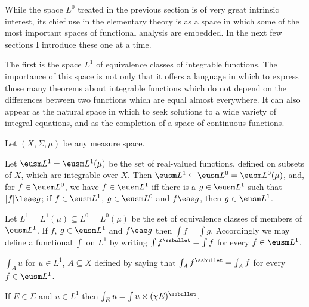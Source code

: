 
\def\chaptername{Function spaces}
\def\sectionname{$L^1$}


While the space $L^0$ treated in the previous section is of very great
intrinsic interest, its chief use in the elementary theory is as a
space
in which some of the most important spaces of functional analysis are
embedded.   In the next few sections I introduce these one at a time.

The first is the space $L^1$ of equivalence classes of integrable
functions.   The importance of this space is not only that it offers a
language in which to express those many theorems about integrable
functions which do not depend on the differences between two functions
which are equal almost everywhere.   It can also appear as the natural
space in which to seek solutions to a wide variety of integral
equations, and as the completion of a space of continuous functions.

  Let $(X,\Sigma,\mu)$ be any
measure space.

 Let $\eusm L^1=\eusm L^1(\mu)$ be the set of
real-valued functions, defined on subsets of $X$, which are integrable
over $X$.   Then
$\eusm L^1\subseteq\eusm L^0=\eusm L^0(\mu)$, and, for $f\in\eusm L^0$, we
have $f\in\eusm L^1$ iff there is a $g\in\eusm L^1$ such that
$|f|\leae g$;   if $f\in\eusm L^1$, $g\in\eusm L^0$ and $f\eae g$,
then
$g\in\eusm L^1$.   


 Let $L^1=L^1(\mu)\subseteq L^0=L^0(\mu)$ be
the
set of equivalence
classes of members of $\eusm L^1$.   If $f$, $g\in \eusm L^1$ and
$f\eae g$ then $\int f=\int g$.   Accordingly we may
define a
functional $\int$ on $L^1$ by writing $\int f^{\ssbullet}=\int f$ for
every $f\in\eusm L^1$.

 $\int_Au$ for $u\in L^1$, $A\subseteq X$ defined by saying that
$\int_Af^{\ssbullet}=\int_Af$ for every $f\in\eusm L^1$.   

If $E\in\Sigma$ and $u\in L^1$ then
$\int_Eu=\int u\times(\chi E)^{\ssbullet}$.


